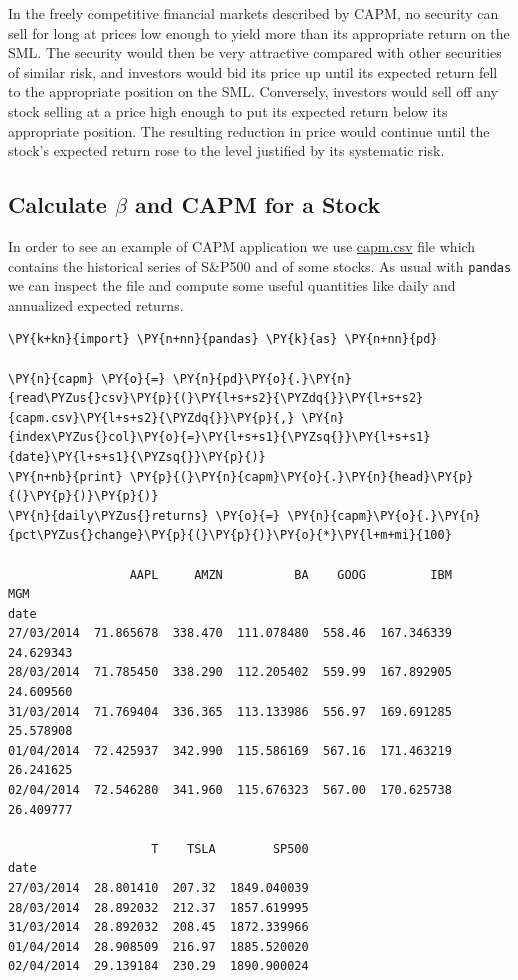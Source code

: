 In the freely competitive financial markets described by CAPM, no security can sell for long at prices low enough to yield more than its appropriate return on the SML. The security would then be very attractive compared with other securities of similar risk, and investors would bid its price up until its expected return fell to the appropriate position on the SML. Conversely, investors would sell off any stock selling at a price high enough to put its expected return below its appropriate position. The resulting reduction in price would continue until the stock’s expected return rose to the level justified by its systematic risk.

\subsection{Calculate $\beta$ and CAPM for a Stock}

In order to see an example of CAPM application we use \href{https://drive.google.com/file/d/1G4U8foyhq9agGPs8cg83-aY4qU8K3jJI/view?usp=sharing}{capm.csv} file which contains the historical series of S\&P500 and of some stocks.
As usual with \texttt{pandas} we can inspect the file and compute some useful quantities like daily and annualized expected returns.

\begin{tcolorbox}[breakable, size=fbox, boxrule=1pt, pad at break*=1mm,colback=cellbackground, colframe=cellborder]
\begin{Verbatim}[commandchars=\\\{\}]
\PY{k+kn}{import} \PY{n+nn}{pandas} \PY{k}{as} \PY{n+nn}{pd}
		
\PY{n}{capm} \PY{o}{=} \PY{n}{pd}\PY{o}{.}\PY{n}{read\PYZus{}csv}\PY{p}{(}\PY{l+s+s2}{\PYZdq{}}\PY{l+s+s2}{capm.csv}\PY{l+s+s2}{\PYZdq{}}\PY{p}{,} \PY{n}{index\PYZus{}col}\PY{o}{=}\PY{l+s+s1}{\PYZsq{}}\PY{l+s+s1}{date}\PY{l+s+s1}{\PYZsq{}}\PY{p}{)}
\PY{n+nb}{print} \PY{p}{(}\PY{n}{capm}\PY{o}{.}\PY{n}{head}\PY{p}{(}\PY{p}{)}\PY{p}{)}
\PY{n}{daily\PYZus{}returns} \PY{o}{=} \PY{n}{capm}\PY{o}{.}\PY{n}{pct\PYZus{}change}\PY{p}{(}\PY{p}{)}\PY{o}{*}\PY{l+m+mi}{100}

                 AAPL     AMZN          BA    GOOG         IBM        MGM 
date
27/03/2014  71.865678  338.470  111.078480  558.46  167.346339  24.629343
28/03/2014  71.785450  338.290  112.205402  559.99  167.892905  24.609560
31/03/2014  71.769404  336.365  113.133986  556.97  169.691285  25.578908
01/04/2014  72.425937  342.990  115.586169  567.16  171.463219  26.241625
02/04/2014  72.546280  341.960  115.676323  567.00  170.625738  26.409777

                    T    TSLA        SP500
date
27/03/2014  28.801410  207.32  1849.040039
28/03/2014  28.892032  212.37  1857.619995
31/03/2014  28.892032  208.45  1872.339966
01/04/2014  28.908509  216.97  1885.520020
02/04/2014  29.139184  230.29  1890.900024
\end{Verbatim}
\end{tcolorbox}

